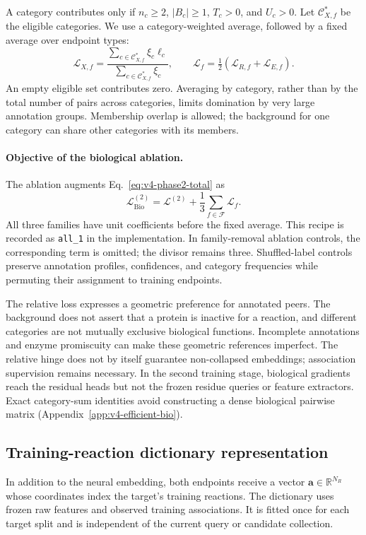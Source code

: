 A category contributes only if $n_c\ge2$, $|B_c|\ge1$, $T_c>0$, and
$U_c>0$. Let $\mathcal C_{X,f}^{*}$ be the eligible categories. We use a
category-weighted average, followed by a fixed average over endpoint types:
\begin{equation}
  \mathcal L_{X,f}=
    \frac{\sum_{c\in\mathcal C_{X,f}^{*}}\xi_c\ell_c}
         {\sum_{c\in\mathcal C_{X,f}^{*}}\xi_c},\qquad
  \mathcal L_f=\tfrac12(\mathcal L_{R,f}+\mathcal L_{E,f}).
  \label{eq:v4-family-average}
\end{equation}
An empty eligible set contributes zero. Averaging by category, rather than
by the total number of pairs across categories, limits domination by very
large annotation groups. Membership overlap is allowed; the background for
one category can share other categories with its members.

\paragraph{Objective of the biological ablation.}
The ablation augments Eq.~\eqref{eq:v4-phase2-total} as
\begin{equation}
  \mathcal L_{\mathrm{Bio}}^{(2)}=\mathcal L^{(2)}
     +\frac13\sum_{f\in\mathcal F}\mathcal L_f.
  \label{eq:v4-phase2-bio-ablation}
\end{equation}
All three families have unit coefficients before the fixed average. This
recipe is recorded as \texttt{all\_1} in the implementation. In family-removal
ablation controls, the corresponding term is omitted; the divisor remains three.
Shuffled-label controls preserve annotation profiles, confidences, and
category frequencies while permuting their assignment to training endpoints.

The relative loss expresses a geometric preference for annotated peers. The
background does not assert that a protein is inactive for a reaction, and
different categories are not mutually exclusive biological functions.
Incomplete annotations and enzyme promiscuity can make these geometric
references imperfect. The relative hinge does not by itself guarantee
non-collapsed embeddings; association supervision remains necessary. In the
second training stage, biological gradients reach the residual heads but not
the frozen residue queries or feature extractors. Exact category-sum
identities avoid constructing a dense biological pairwise matrix
(Appendix~\ref{app:v4-efficient-bio}).

\subsection{Training-reaction dictionary representation}
\label{sec:v4-dictionary}
In addition to the neural embedding, both endpoints receive a vector
$\mathbf{a}\in\mathbb{R}^{N_R}$ whose coordinates index the target's training
reactions. The dictionary uses frozen raw features and observed training
associations. It is fitted once for each target split and is independent of
the current query or candidate collection.

